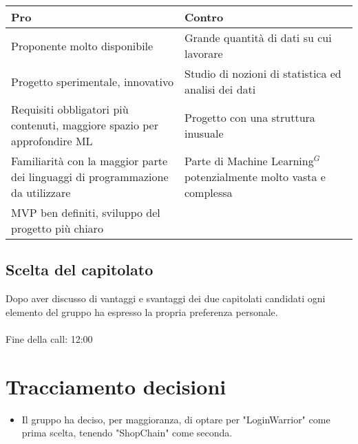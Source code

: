 \begin{tabular}{|p{0.50\linewidth}|p{0.50 \linewidth}|}
	\hline
	\textbf{Pro} & \textbf{Contro}                                                                                                                                             \\
	\hline
	Proponente molto disponibile & Grande quantità di dati su cui lavorare \\
	\hline
	Progetto sperimentale, innovativo & Studio di nozioni di statistica ed analisi dei dati \\
	\hline
	Requisiti obbligatori più contenuti, maggiore spazio per approfondire ML & Progetto con una struttura inusuale\\
	\hline
	Familiarità con la maggior parte dei linguaggi di programmazione da utilizzare& Parte di Machine Learning$^{G}$ potenzialmente molto vasta e complessa\\
	\hline
	MVP ben definiti, sviluppo del progetto più chiaro&\\
	\hline
\end{tabular}
\subsection{Scelta del capitolato}
Dopo aver discusso di vantaggi e svantaggi dei due capitolati candidati ogni elemento del gruppo ha espresso la propria preferenza personale.\\
\\\noindent
Fine della call: 12:00

\section{Tracciamento decisioni}
\begin{itemize}
	\item Il gruppo ha deciso, per maggioranza, di optare per "LoginWarrior" come prima scelta, tenendo "ShopChain" come seconda.
\end{itemize}

